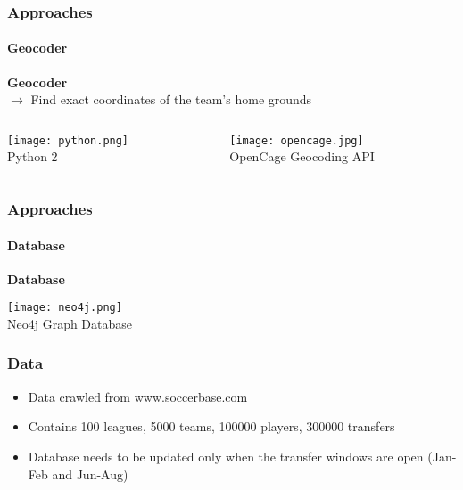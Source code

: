 \documentclass{beamer}
\begin{document}
	 \begin{frame}
    \frametitle{Approaches}
		\framesubtitle{Geocoder}
		\textbf{Geocoder} \\
		$\rightarrow$ Find exact coordinates of the team's home grounds
    \begin{columns}[T] %
     \begin{column}[T]{5cm} %
			\begin{center}
     \texttt{[image: python.png]}\\
			Python 2
			\end{center}
     \end{column}
     \begin{column}[T]{5cm} %
		\begin{center}
		 \texttt{[image: opencage.jpg]} \\
			OpenCage Geocoding API
			\end{center}
     \end{column}
     \end{columns}
  \end{frame}
	
	\begin{frame}
		\frametitle{Approaches}
		\framesubtitle{Database}
		\textbf{Database} \\ 
			\begin{center}
      \texttt{[image: neo4j.png]}\\
			Neo4j Graph Database
			\end{center}
  \end{frame}
	
	\begin{frame}
    \frametitle{Data}
		\begin{itemize}
      \item Data crawled from www.soccerbase.com
			\item Contains 100 leagues, 5000 teams, 100000 players, 300000 transfers
			\item Database needs to be updated only when the transfer windows are open (Jan-Feb and Jun-Aug)
		\end{itemize}
  \end{frame}
	
\end{document}
